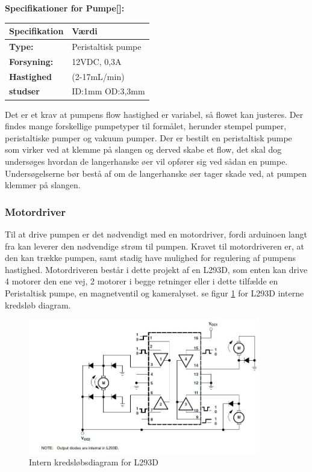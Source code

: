 \textbf{Specifikationer for Pumpe[\citet{DH8}]:} 
\begin{center}
		\begin{longtable}{ | m{6.5cm} | m{6.5cm}| } 
			\hline
			\textbf{Specifikation} &\textbf{Værdi} \\ 
			\hline
			\textbf{Type:} & Peristaltisk pumpe \\ 
			\hline
			\textbf{Forsyning:} & 12VDC, 0,3A  \\ 
			\hline
			\textbf{Hastighed} & (2-17mL/min) \\ 
			\hline		
			\textbf{studser} & ID:1mm OD:3,3mm  \\ 
			\hline	
		\end{longtable}
\end{center}

Det er et krav at pumpens flow hastighed er variabel, så flowet kan justeres. Der findes mange forskellige pumpetyper til formålet, herunder stempel pumper, peristaltiske pumper og vakuum pumper. Der er bestilt en peristaltisk pumpe som virker ved at klemme på slangen og derved skabe et flow, det skal dog undersøges hvordan de langerhanske øer vil opfører sig ved sådan en pumpe. Undersøgelserne bør bestå af om de langerhanske øer tager skade ved, at pumpen klemmer på slangen.

\subsubsection{Motordriver}
Til at drive pumpen er det nødvendigt med en motordriver, fordi arduinoen langt fra kan leverer den nødvendige strøm til pumpen. Kravet til motordriveren er, at den kan trække pumpen, samt stadig have mulighed for regulering af pumpens hastighed.
Motordriveren består i dette projekt af en L293D, som enten kan drive 4 motorer den ene vej, 2 motorer i begge retninger eller i dette tilfælde en Peristaltisk pumpe, en magnetventil og kameralyset. se figur \ref{fig:L293DInterndiagram} for L293D interne kredsløb diagram. 
 
   \begin{figure}[H]
	\centering
	\includegraphics[width=0.9\textwidth]{billeder/Hardware/diagrammer/L293intern.JPG}
	\caption{Intern kredsløbsdiagram for L293D}
	\label{fig:L293DInterndiagram}
\end{figure}

